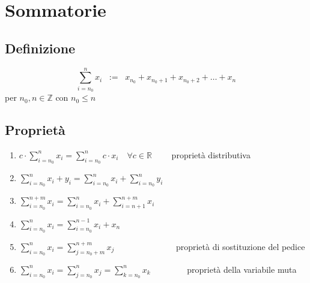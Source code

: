 \documentclass[a4paper]{article}
\begin{document}
\newpage

\section{Sommatorie}
\subsection{Definizione}
\[\sum_{i = n_0} ^ {n} x_i \;\; := \;\; x_{n_0} + x_{n_0+1} + x_{n_0+2} + \dots + x_n\] per \(n_0, n \in \mathbb{Z}\) con \(n_0 \leq n\)


\subsection{Proprietà}
\begin{enumerate}
	\item \(\displaystyle c \cdot \sum_{i = n_0} ^ {n} x_i = \sum_{i = n_0} ^ {n} c \cdot x_i \quad \forall c \in \mathbb{R} \qquad\) proprietà distributiva
	\item \(\displaystyle \sum_{i = n_0} ^ {n} x_i + y_i = \sum_{i = n_0} ^ {n} x_i + \sum_{i = n_0} ^ {n} y_i\)
	\item \(\displaystyle \sum_{i = n_0} ^ {n + m} x_i = \sum_{i = n_0} ^ {n} x_i + \sum_{i = n + 1} ^ {n + m} x_i\)
	\item \(\displaystyle \sum_{i = n_0} ^ {n} x_i = \sum_{i = n_0} ^ {n-1} x_i + x_n\)
	\item \(\displaystyle \sum_{i = n_0} ^ {n} x_i = \sum_{j = n_0 + m} ^ {n + m} x_j \qquad \qquad \qquad \quad\) proprietà di sostituzione del pedice
	\item \(\displaystyle \sum_{i = n_0} ^ {n} x_i = \sum_{j = n_0} ^ {n} x_j = \sum_{k = n_0} ^ {n} x_k \qquad \qquad\) proprietà della variabile muta
\end{enumerate}
\end{document}

